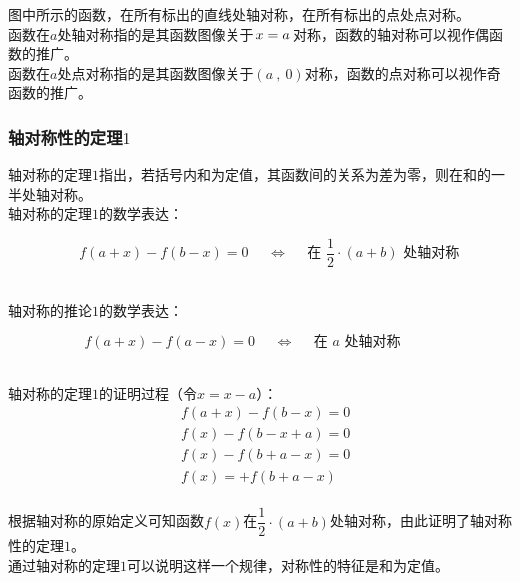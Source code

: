 \documentclass[UTF8]{ctexart}
\begin{document}
    图中所示的函数，在所有标出的直线处轴对称，在所有标出的点处点对称。\\[3mm]
    函数在$a$处轴对称指的是其函数图像关于$\hspace{1.5pt}x=a\hspace{1.5pt}$对称，函数的轴对称可以视作偶函数的推广。\\[3mm]
    函数在$a$处点对称指的是其函数图像关于$(a~,~0)$对称，函数的点对称可以视作奇函数的推广。

\newpage

\subsubsection{轴对称性的定理$1$}
    \setcounter{equation}{0}
    轴对称的定理$1$指出，若括号内和为定值，其函数间的关系为差为零，则在和的一半处轴对称。\\[3mm]
    轴对称的定理$1$的数学表达：
    \begin{large}
        \begin{equation*}
            ~~~~~~f(a+x)-f(b-x)=0~~~~~~\Longleftrightarrow~~~~~~\text{在~}\frac{1}{2}\cdot(a+b)\text{~处轴对称}
        \end{equation*}
    \end{large}\\
    轴对称的推论$1$的数学表达：
    \begin{large}
        \begin{equation*}
            f(a+x)-f(a-x)=0~~~~~~\Longleftrightarrow~~~~~~\text{在~}a\text{~处轴对称}\hspace{30pt}
        \end{equation*}
    \end{large}\\
    轴对称的定理$1$的证明过程（令$x=x-a$）：
    \begin{align}
        &f(a+x)-f(b-x)=0\\[5mm]
        &f(x)-f(b-x+a)=0\\[5mm]
        &f(x)-f(b+a-x)=0\\[5mm]
        &f(x)=+f(b+a-x)
    \end{align}\\
    根据轴对称的原始定义可知函数$f(x)$在$\dfrac{1}{2}\cdot(a+b)$处轴对称，由此证明了轴对称性的定理$1$。\\[3mm]
    通过轴对称的定理$1$可以说明这样一个规律，对称性的特征是和为定值。\vspace{5pt}
\end{document}
